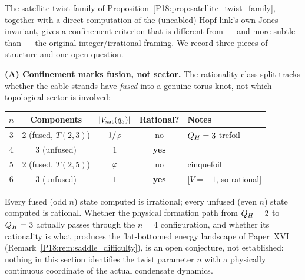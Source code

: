 \begin{remark}[The confinement criterion: fusion, not sector, and a phase relation between $\QH=2$ and $\QH=3$]
\label{P18:rem:richer_criterion}
The satellite twist family of Proposition~\ref{P18:prop:satellite_twist_family},
together with a direct computation of the (uncabled) Hopf link's own
Jones invariant, gives a confinement criterion that is different
from --- and more subtle than --- the original integer/irrational
framing.  We record three pieces of structure and one open question.

\textbf{(A) Confinement marks fusion, not sector.}
The rationality-class split tracks whether the cable strands
have \emph{fused} into a genuine torus knot, not which topological
sector is involved:
\begin{center}
\renewcommand{\arraystretch}{1.3}
\begin{tabular}{ccccl}
\toprule
$n$ & Components & $|V_{\rm sat}(q_5)|$ & Rational? & Notes \\
\midrule
3 & 2 (fused, $T(2,3)$) & $1/\varphi$ & no & $\QH=3$ trefoil \\
4 & 3 (unfused)          & $1$ & \textbf{yes} & \\
5 & 2 (fused, $T(2,5)$) & $\varphi$ & no & cinquefoil \\
6 & 3 (unfused)          & $1$ & \textbf{yes} & [$V=-1$, so rational] \\
\bottomrule
\end{tabular}
\end{center}
Every fused (odd $n$) state computed is irrational; every unfused
(even $n$) state computed is rational.  Whether the physical
formation path from $\QH=2$ to $\QH=3$ actually passes through the
$n=4$ configuration, and whether its rationality is what produces the
flat-bottomed energy landscape of Paper~XVI~\cite{Paper16}
(Remark~\ref{P18:rem:saddle_difficulty}), is an open conjecture, not
established: nothing in this section identifies the twist parameter
$n$ with a physically continuous coordinate of the actual
condensate dynamics.


\end{remark}
